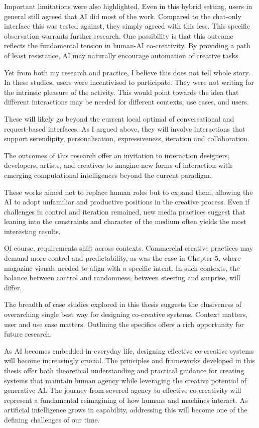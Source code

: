 Important limitations were also highlighted. Even in this hybrid setting, users in general still agreed that AI did most of the work. Compared to the chat-only interface this was tested against, they simply agreed with this less. This specific observation warrants further research. One possibility is that this outcome reflects the fundamental tension in human-AI co-creativity. By providing a path of least resistance, AI may naturally encourage automation of creative tasks.

Yet from both my research and practice, I believe this does not tell whole story. In these studies, users were incentivised to participate. They were not writing for the intrinsic pleasure of the activity. This would point towards the idea that different interactions may be needed for different contexts, use cases, and users. 

These will likely go beyond the current local optimal of conversational and request-based interfaces. As I argued above, they will involve interactions that support serendipity, personalisation, expressiveness, iteration and collaboration.

The outcomes of this research offer an invitation to interaction designers, developers, artists, and creatives to imagine new forms of interaction with emerging computational intelligences beyond the current paradigm. 

These works aimed not to replace human roles but to expand them, allowing the AI to adopt unfamiliar and productive positions in the creative process. Even if challenges in control and iteration remained, new media practices suggest that leaning into the constraints and character of the medium often yields the most interesting results.

Of course, requirements shift across contexts. Commercial creative practices may demand more control and predictability, as was the case in Chapter 5, where magazine visuals needed to align with a specific intent. In such contexts, the balance between control and randomness, between steering and surprise, will differ. 

The breadth of case studies explored in this thesis suggests the elusiveness of overarching single best way for designing co-creative systems. Context matters, user and use case matters. Outlining the specifics offers a rich opportunity for future research. 

As AI becomes embedded in everyday life, designing effective co-creative systems will become increasingly crucial. The principles and frameworks developed in this thesis offer both theoretical understanding and practical guidance for creating systems that maintain human agency while leveraging the creative potential of generative AI. The journey from severed agency to effective co-creativity will represent a fundamental reimagining of how humans and machines interact. As artificial intelligence grows in capability, addressing this will become one of the defining challenges of our time.
